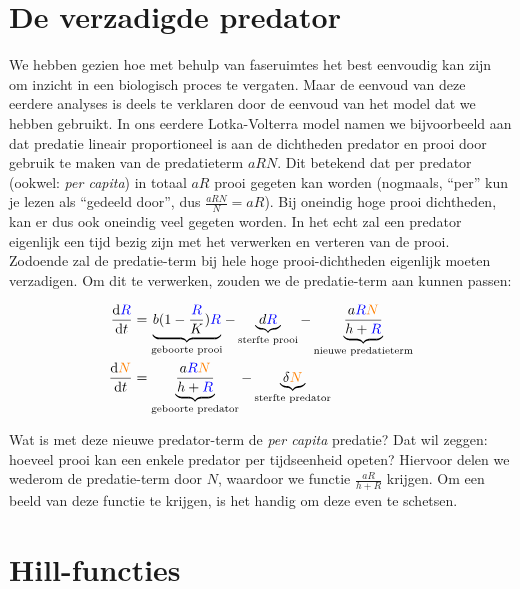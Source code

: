 \documentclass[
  a4paper,
]{scrbook}
\theoremstyle{definition}
\theoremstyle{remark}
\begin{document}
\hypertarget{de-verzadigde-predator}{%
\section{De verzadigde predator}\label{de-verzadigde-predator}}

We hebben gezien hoe met behulp van faseruimtes het best eenvoudig kan
zijn om inzicht in een biologisch proces te vergaten. Maar de eenvoud
van deze eerdere analyses is deels te verklaren door de eenvoud van het
model dat we hebben gebruikt. In ons eerdere Lotka-Volterra model namen
we bijvoorbeeld aan dat predatie lineair proportioneel is aan de
dichtheden predator en prooi door gebruik te maken van de predatieterm
\(aRN\). Dit betekend dat per predator (ookwel: \emph{per capita}) in
totaal \(aR\) prooi gegeten kan worden (nogmaals, ``per'' kun je lezen
als ``gedeeld door'', dus \(\frac{aRN}{N} = aR\)). Bij oneindig hoge
prooi dichtheden, kan er dus ook oneindig veel gegeten worden. In het
echt zal een predator eigenlijk een tijd bezig zijn met het verwerken en
verteren van de prooi. Zodoende zal de predatie-term bij hele hoge
prooi-dichtheden eigenlijk moeten verzadigen. Om dit te verwerken,
zouden we de predatie-term aan kunnen passen:

\begin{align*}
\frac{\mathrm{d}\color{blue}R}{\mathrm{d}t} &= \underbrace{b(1-\frac{\color{blue}R}{K})\color{blue}R}_{\text{geboorte prooi}} - \underbrace{d\color{blue}R}_{\text{sterfte prooi}} - \underbrace{\frac{\color{black}a\color{blue}R\color{orange}N}{h+\color{blue}R\color{black}}}_{\text{nieuwe predatieterm}}\\
\color{black}\frac{\mathrm{d}\color{orange}N}{\mathrm{d}t} &\color{black}= \underbrace{\frac{\color{black}a\color{blue}R\color{orange}N}{h+\color{blue}R\color{black}}}_{\text{geboorte predator}} - \underbrace{\delta \color{orange}N}_{\text{sterfte predator}}
\end{align*}

Wat is met deze nieuwe predator-term de \emph{per capita} predatie? Dat
wil zeggen: hoeveel prooi kan een enkele predator per tijdseenheid
opeten? Hiervoor delen we wederom de predatie-term door \(N\), waardoor
we functie \(\frac{aR}{h+R}\) krijgen. Om een beeld van deze functie te
krijgen, is het handig om deze even te schetsen.

\hypertarget{hill-functies}{%
\section{Hill-functies}\label{hill-functies}}
\end{document}
